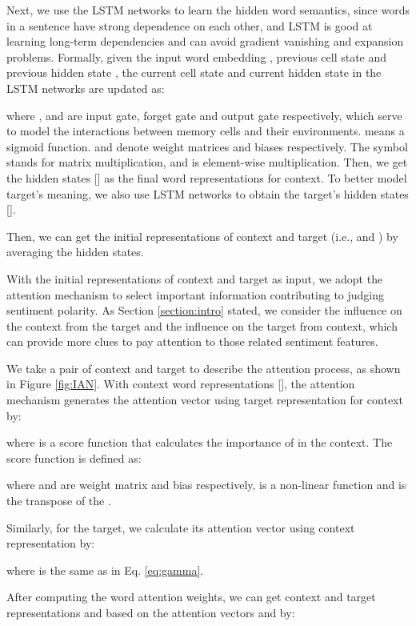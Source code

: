 \documentclass{article}
\begin{document}
Next, we use the LSTM  networks to learn the hidden word semantics, since words in a sentence have strong dependence on each other, and LSTM is good at learning  long-term dependencies and can avoid gradient vanishing and expansion problems. 
Formally, given the input word embedding , previous cell state  and previous hidden state , the current cell state  and current hidden state  in the LSTM networks are updated as: 



where ,  and  are input gate, forget gate and output gate respectively, which serve to model the interactions between memory cells and their environments. 
 means a sigmoid function.
and  denote weight matrices and biases respectively.
The symbol  stands for matrix multiplication, and  is element-wise multiplication.
Then, we get the hidden states  [] as the final word representations for context.
To better model target's meaning, we also use LSTM networks to obtain the target's hidden states [].

Then, we can get the initial representations of context and target (i.e.,  and  ) by averaging the hidden states.



With  the initial representations of context and target as input,  we adopt the attention mechanism to select important information contributing to judging sentiment polarity. 
As Section \ref{section:intro} stated, we consider the influence on the context from the target and the influence on the target from context,  which can provide more clues to pay attention to those related sentiment features. 

We take a pair of context and target to describe the attention process, as shown in Figure \ref{fig:IAN}.
With context word representations [], the attention mechanism generates the attention vector  using target representation  for context by:


where  is a score function that calculates the importance of  in the context. The score function  is defined as:

where   and  are weight matrix and bias respectively,  is a non-linear function and  is the transpose of the .

Similarly, for the target, we calculate its attention vector  using context representation   by:

where  is the same as in Eq. \ref{eq:gamma}.

After computing the word attention weights, we can get context and target representations  and  based on the attention vectors  and  by: 
\end{document}
